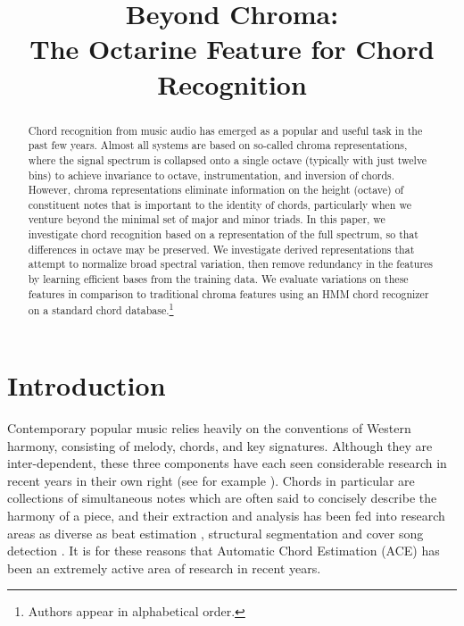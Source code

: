 \documentclass{article}
\title{Beyond Chroma: \\The Octarine Feature for Chord Recognition}
\begin{document}
%
\maketitle
%
\begin{abstract}
Chord recognition from music audio has emerged as a popular and useful task in 
the past few years.  Almost all systems are based on so-called chroma representations, 
where the signal spectrum is collapsed onto a single octave (typically with just twelve 
bins) to achieve invariance to octave, instrumentation, and inversion of chords.  However, 
chroma representations eliminate information on the height (octave) of constituent notes 
that is important to the identity of chords, particularly when we venture beyond the 
minimal set of major and minor triads.  In this paper, we investigate chord recognition based 
on a representation of the full spectrum, so that differences in octave may be preserved.  
We investigate derived representations that attempt to normalize broad spectral variation, then 
remove redundancy in the features by learning efficient bases from the training data.  We 
evaluate variations on these features in comparison to traditional chroma features using an 
HMM chord recognizer on a standard chord database.\footnote{Authors appear in alphabetical order.}

\end{abstract}
%
\section{Introduction}\label{sec:introduction}

Contemporary popular music relies heavily on the conventions of Western harmony, consisting of melody, chords, and key signatures. Although they are inter-dependent, these three components have each seen considerable research in recent years in their own right (see for example \cite{durrieu2010source,6155600,noland2009influences}). Chords in particular are collections of simultaneous notes which are often said to concisely describe the harmony of a piece, and their extraction and analysis has been fed into research areas as diverse as beat estimation \cite{papadopoulos2008simultaneous}, structural segmentation \cite{mauch2009using} and cover song detection \cite{ellis2007identifyingcover}. It is for these reasons that Automatic Chord Estimation (ACE) has been an extremely active area of research in recent years.
\end{document}
